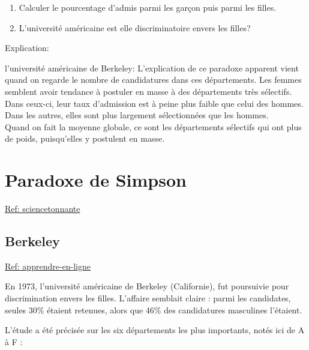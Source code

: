 \documentclass[10pt,dvipsnames, dvips, svgnames]{article}
\begin{document}
\begin{enumerate}
    \item Calculer le pourcentage d'admis parmi les garçon  puis parmi les filles.
	\item L'université américaine est elle discriminatoire envers les filles?
\end{enumerate}

\newpage
Explication:

\begin{list}{}{}
\item l'université américaine de Berkeley:
L'explication de ce paradoxe apparent vient quand on regarde le nombre de candidatures dans ces départements. Les femmes semblent avoir tendance à postuler en masse à des départements très sélectifs. Dans ceux-ci, leur taux d'admission est à peine plus faible que celui des hommes. Dans les autres, elles sont plus largement sélectionnées que les hommes.\\
Quand on fait la moyenne globale, ce sont les départements sélectifs qui ont plus de poids, puisqu'elles y postulent en masse.
\end{list}



\section{Paradoxe de Simpson}


\href{https://sciencetonnante.wordpress.com/2013/04/29/le-paradoxe-de-simpson/}{Ref: sciencetonnante}


\subsection{Berkeley}

\href{https://www.apprendre-en-ligne.net/MADIMU2/STATI/STATI1.PDF}{Ref: apprendre-en-ligne}

En 1973, l'université américaine de Berkeley (Californie), fut poursuivie pour discrimination envers les filles. L'affaire semblait claire : parmi les candidates, seules 30\% étaient retenues, alors que 46\% des candidatures masculines l'étaient.


L'étude a été précisée sur les six départements les plus importants, notés ici de A à F : 
\end{document}
